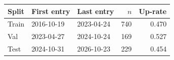 \begin{tabular}{lllrr}
\toprule
Split & First entry & Last entry & $n$ & Up-rate \\
\midrule
Train & 2016-10-19 & 2023-04-24 & 740 & 0.470 \\
Val & 2023-04-27 & 2024-10-24 & 169 & 0.527 \\
Test & 2024-10-31 & 2026-10-23 & 229 & 0.454 \\
\bottomrule
\end{tabular}
